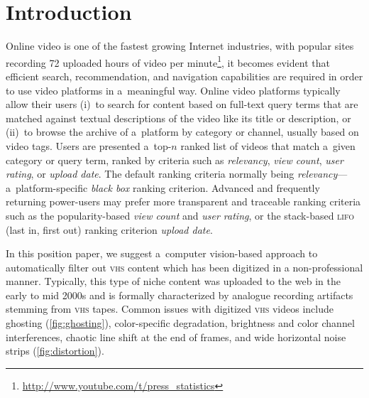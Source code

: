 \documentclass[runningheads,a4paper]{llncs}
\begin{document}
\section{Introduction}
\vspace{-.5em}
Online video is one of the fastest growing Internet industries, with popular sites recording
72 uploaded hours of video per minute\footnote{\url{http://www.youtube.com/t/press_statistics}},
it becomes evident that efficient search, recommendation, and
navigation capabilities are required in order to use
video platforms in a~meaningful way.
Online video platforms typically allow their users
(i)~to search for content based on full-text query terms
that are matched against textual descriptions
of the video like its title or description,
or (ii)~to browse the archive of a~platform by category or channel,
usually based on video tags.
Users are presented a~top-$n$ ranked list of videos
that match a~given category
or query term, ranked by criteria such as
\emph{relevancy}, \emph{view count},
\emph{user rating}, or \emph{upload date}.
The default ranking criteria normally being
\emph{relevancy}---a~platform-specific \emph{black box} ranking criterion.
Advanced and frequently returning power-users
may prefer more transparent and traceable ranking criteria
such as the popularity-based \emph{view count}
and \emph{user rating}, or the stack-based
{\scshape lifo} (last in, first out) ranking criterion \emph{upload date}.

In this position paper, we suggest a~computer vision-based
approach to automatically filter out {\scshape vhs} content
which has been digitized in a non-professional manner.
Typically, this type of niche content was uploaded to the web
in the early to mid 2000s and is formally characterized by
analogue recording artifacts stemming from {\scshape vhs} tapes.
Common issues with digitized {\scshape vhs} videos include
ghosting (\autoref{fig:ghosting}),
color-specific degradation,
brightness and color channel interferences,
chaotic line shift at the end of frames,
and wide horizontal noise strips (\autoref{fig:distortion}).
\end{document}

